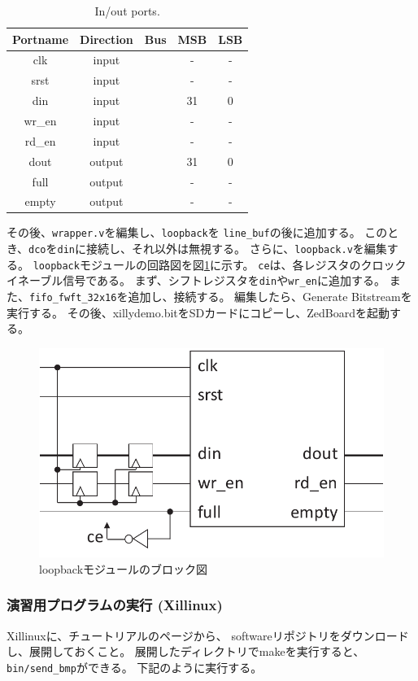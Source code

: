 \documentclass[11pt]{jsarticle}
\begin{document}
\begin{table}[ht]%
	\caption{In/out ports.}
	\label{tbl:inout}
	\begin{center}
		\begin{tabular}{ccccc}
			\hline
			Portname & Direction & Bus & MSB & LSB \\
			\hline \hline
			clk & input &   & - & - \\
			srst & input &   & - & - \\
			din & input & \checkmark & 31 & 0 \\
			wr\_en & input &   & - & - \\
			rd\_en & input &   & - & - \\
			dout & output & \checkmark & 31 & 0 \\
			full & output &   & - & - \\
			empty & output &   & - & - \\
			\hline
		\end{tabular}%
	\end{center}
\end{table}

その後、\verb|wrapper.v|を編集し、\verb|loopback|を
\verb|line_buf|の後に追加する。
このとき、\verb|dco|を\verb|din|に接続し、それ以外は無視する。
さらに、\verb|loopback.v|を編集する。
\verb|loopback|モジュールの回路図を図\ref{img:loopback}に示す。
\verb|ce|は、各レジスタのクロックイネーブル信号である。
まず、シフトレジスタを\verb|din|や\verb|wr_en|に追加する。
また、\verb|fifo_fwft_32x16|を追加し、接続する。
編集したら、Generate Bitstreamを実行する。
その後、xillydemo.bitをSDカードにコピーし、ZedBoardを起動する。

\begin{figure}[ht]
	\centering
	\includegraphics[width=0.5\linewidth]{../img/loopback.pdf}
	\caption{loopbackモジュールのブロック図}
	\label{img:loopback}
\end{figure}

\vspace{-0.5cm}

\subsubsection*{演習用プログラムの実行 (Xillinux)}
Xillinuxに、チュートリアルのページから、
softwareリポジトリをダウンロードし、展開しておくこと。
展開したディレクトリでmakeを実行すると、
\verb|bin/send_bmp|ができる。
下記のように実行する。
\end{document}
